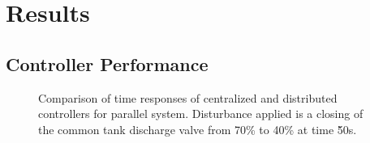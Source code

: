 \chapter{Results}
\label{sec:results}
\section{Controller Performance}

\begin{figure}
  \begin{subfigure}{0.48\linewidth}
    \footnotesize
    
    \normalsize
  \end{subfigure}
  \hfill
  \begin{subfigure}{0.48\linewidth}
    \footnotesize
    
    \normalsize
  \end{subfigure}
  
  \caption{Comparison of time responses of centralized and distributed controllers for parallel system. Disturbance applied is a closing of the common tank discharge valve from 70\% to 40\% at time \u{50}{s}.}
  \label{fig:res:parallel_timeresp}
\end{figure}

